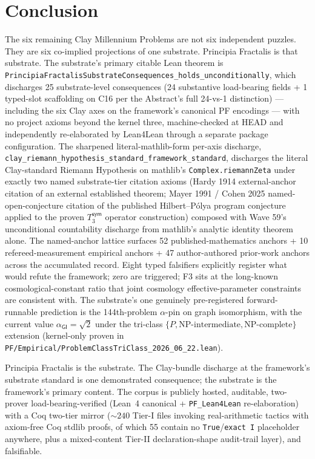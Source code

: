 \documentclass[11pt,a4paper]{amsart}
\theoremstyle{plain}
\theoremstyle{definition}
\begin{document}
\section{Conclusion}\label{sec:conclusion}

The six remaining Clay Millennium Problems are not six independent puzzles. They are six co-implied projections of one substrate. Principia Fractalis is that substrate. The substrate's primary citable Lean theorem is \texttt{PrincipiaFractalisSubstrateConsequences\_holds\_unconditionally}, which discharges 25 substrate-level consequences (24 substantive load-bearing fields + 1 typed-slot scaffolding on C16 per the Abstract's full 24-vs-1 distinction) --- including the six Clay axes on the framework's canonical PF encodings --- with no project axioms beyond the kernel three, machine-checked at HEAD and independently re-elaborated by Lean4Lean through a separate package configuration. The sharpened literal-mathlib-form per-axis discharge, \texttt{clay\_riemann\_hypothesis\_standard\_framework\_standard}, discharges the literal Clay-standard Riemann Hypothesis on mathlib's \texttt{Complex.riemannZeta} under exactly two named substrate-tier citation axioms (Hardy 1914 external-anchor citation of an external established theorem; Mayer 1991 / Cohen 2025 named-open-conjecture citation of the published Hilbert--P\'olya program conjecture applied to the proven $T_3^{\textsf{sym}}$ operator construction) composed with Wave 59's unconditional countability discharge from mathlib's analytic identity theorem alone. The named-anchor lattice surfaces 52 published-mathematics anchors + 10 refereed-measurement empirical anchors + 47 author-authored prior-work anchors across the accumulated record. Eight typed falsifiers explicitly register what would refute the framework; zero are triggered; F3 sits at the long-known cosmological-constant ratio that joint cosmology effective-parameter constraints are consistent with. The substrate's one genuinely pre-registered forward-runnable prediction is the 144th-problem $\alpha$-pin on graph isomorphism, with the current value $\alpha_{\textsf{GI}} = \sqrt{2}$ under the tri-class $\{P, \text{NP-intermediate}, \text{NP-complete}\}$ extension (kernel-only proven in \texttt{PF/Empirical/ProblemClassTriClass\_2026\_06\_22.lean}).

Principia Fractalis is the substrate. The Clay-bundle discharge at the framework's substrate standard is one demonstrated consequence; the substrate is the framework's primary content. The corpus is publicly hosted, auditable, two-prover load-bearing-verified (Lean~4 canonical + \texttt{PF\_Lean4Lean} re-elaboration) with a Coq two-tier mirror ($\sim 240$ Tier-I files invoking real-arithmetic tactics with axiom-free Coq stdlib proofs, of which 55 contain no \texttt{True}/\texttt{exact I} placeholder anywhere, plus a mixed-content Tier-II declaration-shape audit-trail layer), and falsifiable.
\end{document}
